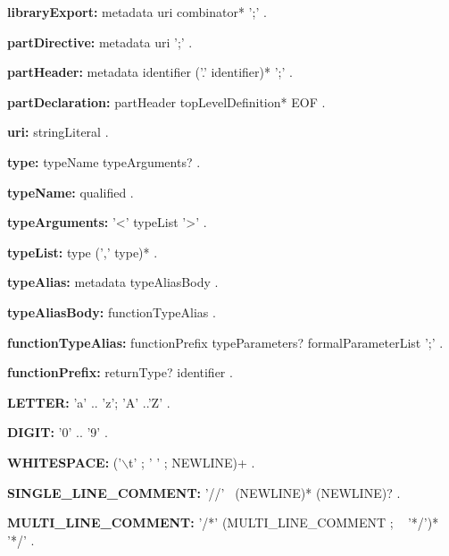 \begin{grammar}
{\bf libraryExport:}
    metadata \EXPORT{}  uri  combinator* ';'
    .
\end{grammar}
\begin{grammar}
{\bf partDirective:}
    metadata \PART{}   uri ';' 
    .

{\bf partHeader:}
    metadata \PART{} \OF{} identifier ('.' identifier)* ';'
    .

{\bf partDeclaration:}
    partHeader topLevelDefinition* EOF
    .
\end{grammar}
\begin{grammar}
{\bf uri:}
    stringLiteral
    .
\end{grammar}
\begin{grammar}
{\bf type:}
    typeName typeArguments?
    .

{\bf typeName:}
    qualified 
    .

{\bf typeArguments:}
    '<' typeList '>'
    .

{\bf typeList:}
    type (',' type)*
    .
 \end{grammar}
\begin{grammar}

{\bf typeAlias:}
    metadata \TYPEDEF{} typeAliasBody
    .
  
{\bf typeAliasBody:}
    functionTypeAlias
    .

{\bf functionTypeAlias:}
    functionPrefix typeParameters? formalParameterList ';'
    .
    
{\bf functionPrefix:}
    returnType? identifier
    .    
\end{grammar}
\begin{grammar}
{\bf LETTER:}
    'a' .. 'z';
    'A' ..'Z'
    .

{\bf DIGIT:}
    '0' .. '9'
    .

{\bf WHITESPACE:}
    ('$\backslash$t' ; ' ' ; NEWLINE)+
    .
\end{grammar}
\begin{grammar}
{\bf SINGLE_LINE_COMMENT:}
    '//' ~(NEWLINE)* (NEWLINE)?
    .

{\bf MULTI_LINE_COMMENT:}
    '/*' (MULTI_LINE_COMMENT ; ~ '*/')* '*/'
    .
\end{grammar}